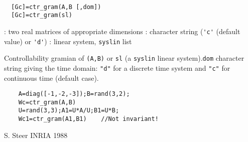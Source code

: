 \begin{mandesc}
   \\ %
\end{mandesc}
\begin{calling_sequence}
\begin{verbatim}
  [Gc]=ctr_gram(A,B [,dom])  
  [Gc]=ctr_gram(sl)  
\end{verbatim}
\end{calling_sequence}
\begin{parameters}
  \begin{varlist}
    : two real matrices of appropriate dimensions
    : character string (\verb!'c'! (default value) or \verb!'d'!)
    : linear system, \verb!syslin! list
  \end{varlist}
\end{parameters}
\begin{mandescription}
  Controllability gramian of \verb!(A,B)! or \verb!sl! (a \verb!syslin! 
  linear system).\verb!dom! character string giving the time domain: \verb!"d"! for a
  discrete time system and \verb!"c"! for continuous time (default case).
\end{mandescription}
\begin{examples}
  \begin{Verbatim}
    A=diag([-1,-2,-3]);B=rand(3,2);
    Wc=ctr_gram(A,B)
    U=rand(3,3);A1=U*A/U;B1=U*B;
    Wc1=ctr_gram(A1,B1)    //Not invariant!
  \end{Verbatim}
\end{examples}
\begin{manseealso}
         
\end{manseealso}
\begin{authors}
  S. Steer INRIA 1988
\end{authors}
